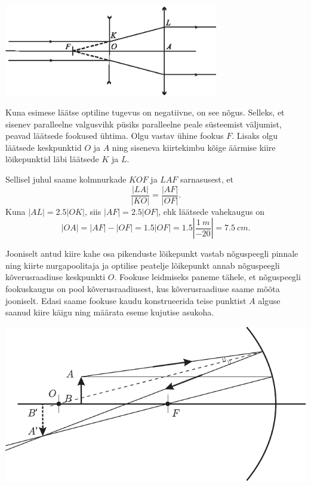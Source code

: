 \documentclass[10pt, twoside]{article}
\begin{document}
{%

\solu
\begin{center}
	\includegraphics[width=0.7\textwidth]{2010-v2g-03-laiendi.eps}
\end{center}

Kuna esimese läätse optiline tugevus on negatiivne, on see nõgus. Selleks, et sisenev paralleelne valgusvihk püsiks paralleelne peale süsteemist väljumist, peavad läätsede fookused ühtima. Olgu vastav ühine fookus $F$. Lisaks olgu läätsede keskpunktid $O$ ja $A$ ning siseneva kiirtekimbu kõige äärmise kiire lõikepunktid läbi läätsede $K$ ja $L$.

Sellisel juhul saame kolmnurkade $KOF$ ja $LAF$ sarnasusest, et 
\[
\frac{|LA|}{|KO|}=\frac{|AF|}{|OF|}.
\]
Kuna $|AL| = \num{2.5}|OK|$, siis $|AF| = \num{2.5}|OF|$, ehk läätsede vahekaugus on 
\[
|OA| = |AF| - |OF| = \num{1.5}|OF| = \num{1.5} \left\lvert\frac{\SI{1}{m}}{\num{-20}}\right\rvert = \SI{7.5}{cm}.
\]
\probend
\bigskip


\solu
Jooniselt antud kiire kahe osa pikenduste lõikepunkt vastab nõguspeegli pinnale ning kiirte nurgapoolitaja ja optilise peatelje lõikepunkt annab nõguspeegli kõverusraadiuse keskpunkti $O$. Fookuse leidmiseks paneme tähele, et nõguspeegli fookuskaugus on pool kõverusraadiusest, kus kõverusraadiuse saame mõõta jooniselt. Edasi saame fookuse kaudu konstrueerida teise punktist $A$ alguse saanud kiire käigu ning määrata eseme kujutise asukoha.

\begin{center}
	\includegraphics[width=\linewidth]{2006-v3g-02-lah}
\end{center}
\probend
\bigskip

}
\end{document}
